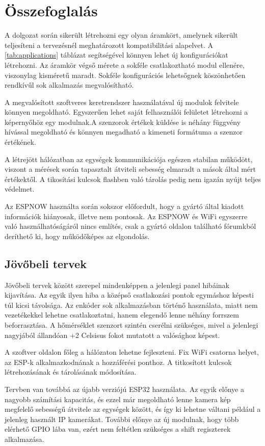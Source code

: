 \chapter{Összefoglalás}

A dolgozat során sikerült létrehozni egy olyan áramkört, amelynek sikerült teljesíteni a tervezésnél meghatározott kompatibilitási alapelvet. A \ref{tab:applications} táblázat segítségével könnyen lehet új konfigurációkat létrehozni. Az áramkör végső mérete a sokféle csatlakoztható modul ellenére, viszonylag kisméretű maradt. Sokféle konfigurációs lehetsőgnek köszönhetően rendkívűl sok alkalmazás megvalósítható.

A megvalósított szoftveres keretrendszer használatával új modulok felvitele könnyen megoldható. Egyszerűen lehet saját felhasználói felületet létrehozni a képernyőhöz egy modulnak.A szenzorok értékek küldése is néhány függvény hívással megoldható és könnyen megadható a kimeneti formátuma a szenzor értékének.

A létrejött hálózatban az egységek kommunikációja egészen stabilan működött, viszont a mérések során tapasztalt átviteli sebesség elmaradt a mások által mért értékektől. A tikosítási kulcsok flashben való tárolás pedig nem igazán nyújt teljes védelmet.

Az ESPNOW használta során sokszor előfordult, hogy a gyártó által kiadott információk hiányosak, illetve nem pontosak. Az ESPNOW és WiFi egyszerre való használhatóságáról nincs említés, csak a gyártó oldalon található fórumkból deríthető ki, hogy működőképes az elgondolás.

\section{Jövőbeli tervek}

Jövőbeli tervek között szerepel mindenképpen a jelenlegi panel hibáinak kijavítása. Az egyik ilyen hiba a középső csatlakozási pontok egymáshoz képesti túl kicsi távolsága. Az enkóder sok alkalmazásban történő használata, miatt nem vezetékekkel lehetne csatlakoztatni, hanem elegendő lenne néhány forrszem beforrasztása. A hőmérséklet szenzort szintén cserélni szükséges, mivel a jelenlegi nagyjából állandóan +2 Celsisus fokot mutatott a valósághoz képest.

A szoftver oldalon főleg a hálózaton lehetne fejleszteni. Fix WiFi csatorna helyet, az ESP-k alkalmazkodnának a hozzáférési ponthoz. A titkosított kulcsok létrehozásának és tárolásának módosítása.

Tervben van továbbá az újabb verziójú ESP32 használata. Az egyik előnye a nagyobb számítási kapacitás, és ezzel már megoldható lenne kamera kép megfelelő sebességű átvitele az egységek között, és így ki lehetne váltani például a jelenleg használt IP kamerákat. További előnye az új modulnak, hogy több elérhető GPIO lába van, ezért nem feltétlen szükséges a shift regiszterek alkalmazása.